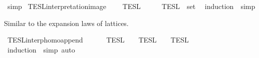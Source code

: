 \begin{isabellebody}
%
\isadelimproof
%
\endisadelimproof
%
\isatagproof
{}\isamarkupfalse%
\ simp%
\endisatagproof
{\isafoldproof}%
%
\isadelimproof
%
\endisadelimproof
%
\isadelimdocument
%
\endisadelimdocument
%
\isatagdocument
%
\isamarkuptrue%
%
\endisatagdocument
{\isafolddocument}%
%
\isadelimdocument
%
\endisadelimdocument
{}\isamarkupfalse%
\ TESL{\isacharunderscore}interpretation{\isacharunderscore}image{\isacharcolon}\isanewline
\ \ {\isacartoucheopen}{\isasymlbrakk}{\isasymlbrakk}\ {\isasymPhi}\ {\isasymrbrakk}{\isasymrbrakk}\isactrlsub T\isactrlsub E\isactrlsub S\isactrlsub L\ {\isacharequal}\ {\isasymInter}\ {\isacharparenleft}{\isacharparenleft}{\isasymlambda}{\isasymphi}{\isachardot}\ {\isasymlbrakk}\ {\isasymphi}\ {\isasymrbrakk}\isactrlsub T\isactrlsub E\isactrlsub S\isactrlsub L{\isacharparenright}\ {\isacharbackquote}\ set\ {\isasymPhi}{\isacharparenright}{\isacartoucheclose}\isanewline
%
\isadelimproof
%
\endisadelimproof
%
\isatagproof
{}\isamarkupfalse%
\ {\isacharparenleft}induction\ {\isasymPhi}{\isacharcomma}\ simp{\isacharplus}{\isacharparenright}%
\endisatagproof
{\isafoldproof}%
%
\isadelimproof
%
\endisadelimproof
%
\isadelimdocument
%
\endisadelimdocument
%
\isatagdocument
%
\isamarkuptrue%
%
\endisatagdocument
{\isafolddocument}%
%
\isadelimdocument
%
\endisadelimdocument
%
\begin{isamarkuptext}%
Similar to the expansion laws of lattices.%
\end{isamarkuptext}\isamarkuptrue%
\isamarkupfalse%
\ TESL{\isacharunderscore}interp{\isacharunderscore}homo{\isacharunderscore}append{\isacharcolon}\isanewline
\ \ {\isacartoucheopen}{\isasymlbrakk}{\isasymlbrakk}\ {\isasymPhi}\ {\isacharat}\ {\isasymPhi}\ {\isasymrbrakk}{\isasymrbrakk}\isactrlsub T\isactrlsub E\isactrlsub S\isactrlsub L\ {\isacharequal}\ {\isasymlbrakk}{\isasymlbrakk}\ {\isasymPhi}\ {\isasymrbrakk}{\isasymrbrakk}\isactrlsub T\isactrlsub E\isactrlsub S\isactrlsub L\ {\isasyminter}\ {\isasymlbrakk}{\isasymlbrakk}\ {\isasymPhi}\ {\isasymrbrakk}{\isasymrbrakk}\isactrlsub T\isactrlsub E\isactrlsub S\isactrlsub L{\isacartoucheclose}\isanewline
%
\isadelimproof
%
\endisadelimproof
%
\isatagproof
{}\isamarkupfalse%
\ {\isacharparenleft}induction\ {\isasymPhi}\ simp{\isacharcomma}\ auto{\isacharparenright}%
\endisatagproof

\end{isabellebody}

